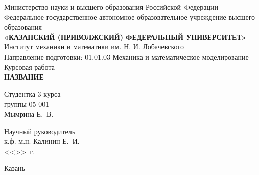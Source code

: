 \begin{titlepage}
\begin{center}

\hfill \break

\large{Министерство науки и высшего образования Российской~Федерации}\\
\footnotesize{Федеральное государственное автономное образовательное учреждение высшего образования}\\ 
\small{\textbf{«КАЗАНСКИЙ (ПРИВОЛЖСКИЙ) ФЕДЕРАЛЬНЫЙ УНИВЕРСИТЕТ»}}\\

\hfill \break
\normalsize{Институт механики и математики им. Н. И. Лобачевского}\\

\hfill \break
\normalsize{Направление подготовки: 01.01.03 Механика и математическое моделирование}\\

\vspace{25mm}
\large{Курсовая работа}\\
\large{\textbf{НАЗВАНИЕ}}\\
\end{center}

\vspace{20mm}
\noindent
Студентка 3 курса \\
группы 05-001 \\
Мымрина Е.~В.

\hfill \break
Научный руководитель \\
к.ф.-м.н. Калинин Е.~И. \\
<<\underline{\hspace{0,75cm}}>>\underline{\hspace{2cm}}\the\year~г.

\vspace{\fill}

\begin{center}
    Казань -- \the\year
\end{center}
\thispagestyle{empty}

\end{titlepage}
